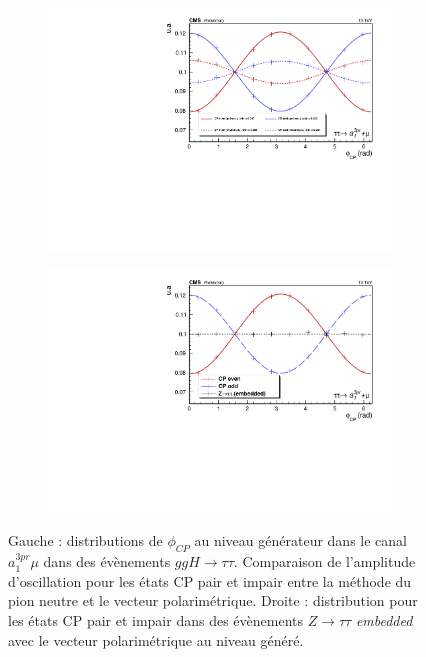 \begin{figure}[]
  \begin{subfigure}[b]{0.5\linewidth}
    \centering
    \includegraphics[width=\linewidth]{Chapitre6/Images/A1MU/a1mu_pvdpgen.pdf} 
    \caption*{} 
    \vspace{0.5ex}
  \end{subfigure}%
  \begin{subfigure}[b]{0.5\linewidth}
    \centering
    \includegraphics[width=\linewidth]{Chapitre6/Images/A1MU/a1mu_genpv.pdf} 
    \caption*{} 
    \vspace{0.5ex}
  \end{subfigure} 
\caption{Gauche : distributions de $\phi_{CP}$ au niveau générateur dans le canal $a_1^{3pr}\mu$ dans des évènements $ggH\to\tau\tau$. Comparaison de l'amplitude d'oscillation pour les états CP pair et impair entre la méthode du pion neutre et le vecteur polarimétrique. Droite : distribution pour les états CP pair et impair dans des évènements $Z\to\tau\tau$ \textit{embedded} avec le vecteur polarimétrique au niveau généré.}
\label{a1mugen}
\end{figure}

